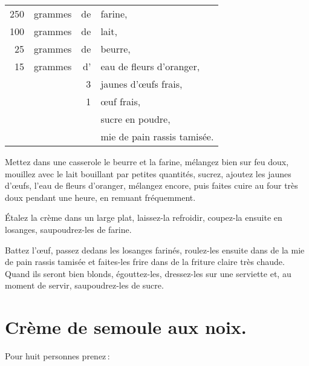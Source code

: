 \footnotesize
\begin{longtable}{rrrp{16em}}
    250 & grammes & de & farine,                                                                          \\
    100 & grammes & de & lait,                                                                            \\
     25 & grammes & de & beurre,                                                                          \\
     15 & grammes & d' & eau de fleurs d'oranger,                                                         \\
        &         &  3 & jaunes d'œufs frais,                                                             \\
        &         &  1 & œuf frais,                                                                       \\
        &         &    & sucre en poudre,                                                                 \\
        &         &    & mie de pain rassis tamisée.                                                      \\
\end{longtable}
\normalsize

Mettez dans une casserole le beurre et la farine, mélangez bien sur feu doux,
mouillez avec le lait bouillant par petites quantités, sucrez, ajoutez les
jaunes d'œufs, l'eau de fleurs d'oranger, mélangez encore, puis faites cuire au
four très doux pendant une heure, en remuant fréquemment.

Étalez la crème dans un large plat, laissez-la refroidir, coupez-la ensuite en
losanges, saupoudrez-les de farine.

Battez l'œuf, passez dedans les losanges farinés, roulez-les ensuite dans de la
mie de pain rassis tamisée et faites-les frire dans de la friture claire très
chaude. Quand ils seront bien blonds, égouttez-les, dressez-les sur une
serviette et, au moment de servir, saupoudrez-les de sucre.

\section*{\centering Crème de semoule aux noix.}
{}

Pour huit personnes prenez :

